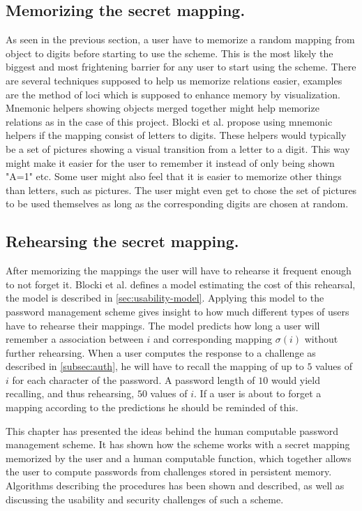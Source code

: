 \subsection{Memorizing the secret mapping.}
As seen in the previous section, a user have to memorize a random mapping from object to digits before starting to use the scheme. This is the most likely the biggest and most frightening barrier for any user to start using the scheme. There are several techniques supposed to help us memorize relations easier, examples are the method of loci \cite{human-memory} which is supposed to enhance memory by visualization. Mnemonic helpers showing objects merged together might help memorize relations as in the case of this project. Blocki et al. \cite{hcp-blocki} propose using mnemonic helpers if the mapping consist of letters to digits. These helpers would typically be a set of pictures showing a visual transition from a letter to a digit. This way might make it easier for the user to remember it instead of only being shown "A=1" etc. Some user might also feel that it is easier to memorize other things than letters, such as pictures. The user might even get to chose the set of pictures to be used themselves as long as the corresponding digits are chosen at random. 

\subsection{Rehearsing the secret mapping.}
After memorizing the mappings the user will have to rehearse it frequent enough to not forget it. Blocki et al. \cite{naturally-rehearsing} defines a model estimating the cost of this rehearsal, the model is described in \ref{sec:usability-model}. Applying this model to the password management scheme gives insight to how much different types of users have to rehearse their mappings. The model predicts how long a user will remember a association between $i$ and corresponding mapping $\sigma(i)$ without further rehearsing. When a user computes the response to a challenge as described in \autoref{subsec:auth}, he will have to recall the mapping of up to $5$ values of $i$ for each character of the password. A password length of $10$ would yield recalling, and thus rehearsing, $50$ values of $i$. If a user is about to forget a mapping according to the predictions he should be reminded of this.





\par 
This chapter has presented the ideas behind the human computable password management scheme. It has shown how the scheme works with a secret mapping memorized by the user and a human computable function, which together allows the user to compute passwords from challenges stored in persistent memory. Algorithms describing the procedures has been shown and described, as well as discussing the usability and security challenges of such a scheme.
